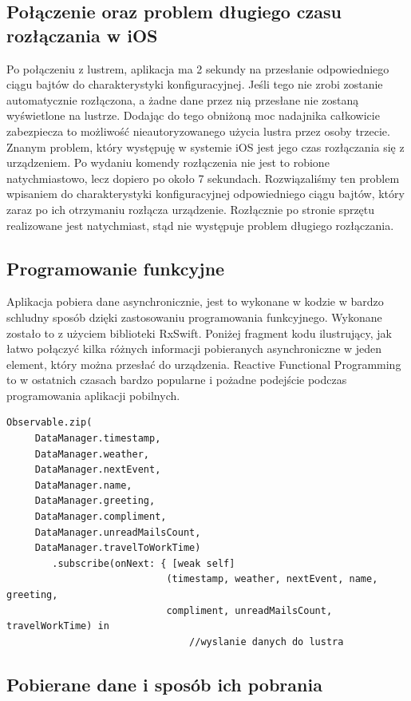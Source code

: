 \documentclass[a4paper,11pt]{article}
\begin{document}
\subsection{Połączenie oraz problem długiego czasu rozłączania w iOS}
Po połączeniu z lustrem, aplikacja ma 2 sekundy na przesłanie odpowiedniego ciągu bajtów do charakterystyki konfiguracyjnej. Jeśli tego nie zrobi zostanie automatycznie rozłączona, a żadne dane przez nią przesłane nie zostaną wyświetlone na lustrze. Dodając do tego obniżoną moc nadajnika całkowicie zabezpiecza to możliwość nieautoryzowanego użycia lustra przez osoby trzecie. Znanym problem, który występuję w systemie iOS jest jego czas rozłączania się z urządzeniem. Po wydaniu komendy rozłączenia nie jest to robione natychmiastowo, lecz dopiero po około 7 sekundach. Rozwiązaliśmy ten problem wpisaniem do charakterystyki konfiguracyjnej odpowiedniego ciągu bajtów, który zaraz po ich otrzymaniu rozłącza urządzenie. Rozłącznie po stronie sprzętu realizowane jest natychmiast, stąd nie występuje problem długiego rozłączania.

\subsection{Programowanie funkcyjne}
Aplikacja pobiera dane asynchronicznie, jest to wykonane w kodzie w bardzo schludny sposób dzięki zastosowaniu programowania funkcyjnego. Wykonane zostało to z użyciem biblioteki RxSwift. Poniżej fragment kodu ilustrujący, jak łatwo połączyć kilka różnych informacji pobieranych asynchroniczne w jeden element, który można przesłać do urządzenia. Reactive Functional Programming to w ostatnich czasach bardzo popularne i pożadne podejście podczas programowania aplikacji pobilnych.

\begin{lstlisting}
Observable.zip(
	 DataManager.timestamp,
	 DataManager.weather,
	 DataManager.nextEvent, 
	 DataManager.name,
	 DataManager.greeting, 
	 DataManager.compliment, 
	 DataManager.unreadMailsCount, 
	 DataManager.travelToWorkTime)
	  	.subscribe(onNext: { [weak self] 
	  						(timestamp, weather, nextEvent, name, greeting,
	  						compliment, unreadMailsCount, travelWorkTime) in
	  							//wyslanie danych do lustra
\end{lstlisting}

\subsection{Pobierane dane i sposób ich pobrania}
\end{document}
